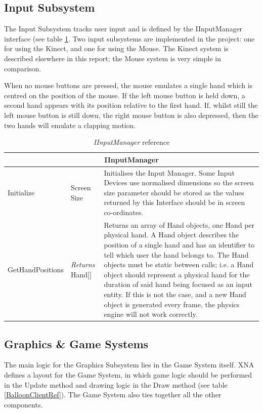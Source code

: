 \clearpage{}
\subsection{Input Subsystem}
The Input Subsystem tracks user input and is defined by the IInputManager
interface (see table \ref{InputManagerRef}. Two input subsystems are implemented in 
the project: one for using the Kinect, and one for using the Mouse. The Kinect 
system is described elsewhere in this report; the Mouse system is very simple in 
comparison.
 
When no mouse buttons are pressed, the mouse emulates a single hand which is
centred on the position of the mouse. If the left mouse button is held down, a
second hand appears with its position relative to the first hand. If, whilst
still the left mouse button is still down, the right mouse button is also
depressed, then the two hands will emulate a clapping motion.

\begin{table}[H]
\begin{tabular}{|p{3.6cm}|p{3cm}|p{9cm}|}
\hline
\multicolumn{3}{|c|}{IInputManager} \\ \hline
Initialize & Screen Size & 
Initialises the Input Manager. Some Input Devices use normalised dimensions so
the screen size parameter should be stored as the values returned by this 
Interface should be in screen co-ordinates. \\ \hline

GetHandPositions & \emph{Returns} Hand[] &
Returns an array of Hand objects, one Hand per physical hand. A Hand object
describes the position of a single hand and has an identifier to tell which
user the hand belongs to. 
The Hand objects must be static between calls; i.e. a Hand object should
represent a physical hand for the duration of said hand being focused as an
input entity. If this is not the case, and a new Hand object is generated 
every frame, the physics engine will not work correctly. \\ \hline
\end{tabular}
\caption{\emph{IInputManager} reference}

\label{InputManagerRef}
\end{table}

\subsection{Graphics \& Game Systems}
The main logic for the Graphics Subsystem lies in the Game System itself. XNA
defines a layout for the Game System, in which game logic should be performed
in the Update method and drawing logic in the Draw method (see table
\vref{BalloonClientRef}). The Game System also
ties together all the other components.

